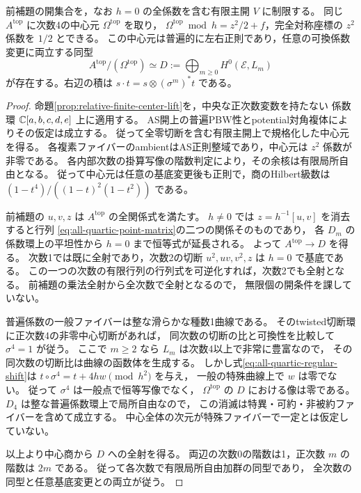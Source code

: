 \begin{theorem}\label{thm:degree-two-all-top-thcr}
前補題の開集合を，なお $h=0$ の全係数を含む有限主開 $V$ に制限する。
同じ $A^{\mathrm{top}}$ に次数4の中心元 $\Omega^{\mathrm{top}}$ を取り，
$\Omega^{\mathrm{top}}\bmod h=z^2/2+f$，完全対称座標の $z^2$ 係数を $1/2$ とできる。
この中心元は普遍的に左右正則であり，任意の可換係数変更に両立する同型
\[
 A^{\mathrm{top}}/(\Omega^{\mathrm{top}})
       \simeq D:=\bigoplus_{m\ge0}H^0(\mathcal E,L_m)
\]
が存在する。右辺の積は $s\cdot t=s\otimes(\sigma^m)^*t$ である。
\end{theorem}
\begin{proof}
命題\ref{prop:relative-finite-center-lift}を，中央な正次数変数を持たない
係数環 $\mathbb C[a,b,c,d,e]$ 上に適用する。
AS開上の普遍PBW性とpotential対角複体によりその仮定は成立する。
従って全零切断を含む有限主開上で規格化した中心元を得る。
各複素ファイバーのambientはAS正則整域であり，中心元は $z^2$ 係数が非零である。
各内部次数の掛算写像の階数判定により，その余核は有限局所自由となる。
従って中心元は任意の基底変更後も正則で，商のHilbert級数は
$(1-t^4)/((1-t)^2(1-t^2))$ である。

前補題の $u,v,z$ は $A^{\mathrm{top}}$ の全関係式を満たす。
$h\ne0$ では $z=h^{-1}[u,v]$ を消去すると行列
\eqref{eq:all-quartic-point-matrix}の二つの関係そのものであり，
各 $D_m$ の係数環上の平坦性から $h=0$ まで恒等式が延長される。
よって $A^{\mathrm{top}}\to D$ を得る。
次数1では既に全射であり，次数2の切断 $u^2,uv,v^2,z$ は $h=0$ で基底である。
この一つの次数の有限行列の行列式を可逆化すれば，次数2でも全射となる。
前補題の乗法全射から全次数で全射となるので，
無限個の開条件を課していない。

普遍係数の一般ファイバーは整な滑らかな種数1曲線である。
そのtwisted切断環に正次数4の非零中心切断があれば，
同次数の切断の比と可換性を比較して $\sigma^4=1$ が従う。
ここで $m\ge2$ なら $L_m$ は次数4以上で非常に豊富なので，
その同次数の切断比は曲線の函数体を生成する。
しかし式\eqref{eq:all-quartic-regular-shift}は
$t\circ\sigma^4=t+4hw\pmod {h^2}$ を与え，
一般の特殊曲線上で $w$ は零でない。
従って $\sigma^4$ は一般点で恒等写像でなく，
$\Omega^{\mathrm{top}}$ の $D$ における像は零である。
$D_4$ は整な普遍係数環上で局所自由なので，
この消滅は特異・可約・非被約ファイバーを含めて成立する。
中心全体の次元が特殊ファイバーで一定とは仮定していない。

以上より中心商から $D$ への全射を得る。
両辺の次数0の階数は1，正次数 $m$ の階数は $2m$ である。
従って各次数で有限局所自由加群の同型であり，
全次数の同型と任意基底変更との両立が従う。
\end{proof}

